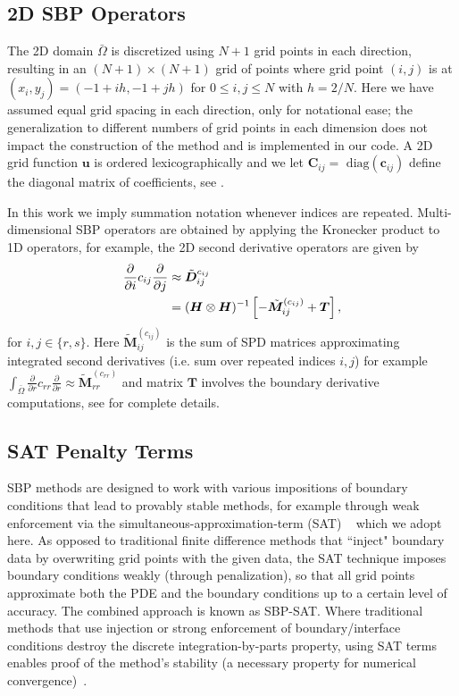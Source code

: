 \subsection{2D SBP Operators}\label{2d_sbp}
The 2D domain $\bar\Omega$ is discretized using $N+1$ grid points in each direction, resulting in an  $(N+1) \times (N+1)$
grid of points where grid point $(i,j)$ is at $(x_i, y_j) = (-1 + ih, -1 + jh)$ for $0
\leq i, j \leq N$ with $h = 2/N$. Here we have assumed equal grid spacing in each direction, only for notational ease; the generalization to different
numbers of grid points in each dimension does not
impact the construction of the method and is implemented in our code. A 2D grid function $\boldsymbol{u}$ is ordered lexicographically and we let $\boldsymbol{C}_{ij} = \text{ diag}(\boldsymbol{c}_{ij})$ define the diagonal matrix of coefficients, see \citep{Kozdon2020HybridizedSF}.

In this work we imply summation notation whenever indices are repeated. Multi-dimensional SBP operators are obtained by applying the Kronecker product to 1D operators, for example, the 2D second derivative operators are given by
\begin{align}\label{eqn: D2}
  \frac{\partial }{\partial i} c_{ij} \frac{\partial }{\partial j}&\approx \tilde{\boldsymbol{D}}^{c_{ij}}_{ij} \notag \\&= (\boldsymbol{H} \otimes \boldsymbol{H})^{-1}\left[- \tilde{\boldsymbol{M}}^{(c_{ij})}_{ij} + \boldsymbol{T}\right],
\end{align}
for $i, j \in \{r, s\}$.   
Here $\tilde{\boldsymbol{M}}^{(c_{ij})}_{ij}$ is the sum of SPD matrices approximating integrated second derivatives (i.e. sum over repeated indices $i, j$) for example $\int_{\bar\Omega} \frac{\partial}{\partial r} c_{rr} \frac{\partial}{\partial r}  \approx  \tilde{\boldsymbol{M}}^{(c_{rr})}_{rr}$ and matrix $\boldsymbol{T}$ involves the boundary derivative computations, see \citep{Erickson2022} for complete details.
 

\subsection{SAT Penalty Terms}
SBP methods are designed to work with various impositions of boundary conditions that lead to provably stable methods, for example through weak enforcement via the simultaneous-approximation-term (SAT) ~\citep{CarpenterGottliebAbarbanel1994} which we adopt here. As opposed to traditional finite difference methods that ``inject" boundary data by overwriting grid points with the given data, the SAT technique imposes boundary conditions weakly (through penalization), so that all grid points approximate both the PDE and the boundary conditions up to a certain level of accuracy.  The combined approach is known as SBP-SAT.
Where traditional methods that use injection or strong enforcement of boundary/interface conditions destroy the discrete integration-by-parts property, using SAT terms enables proof of the method's stability (a necessary property for numerical convergence)~\citep{Mattsson2003}.

